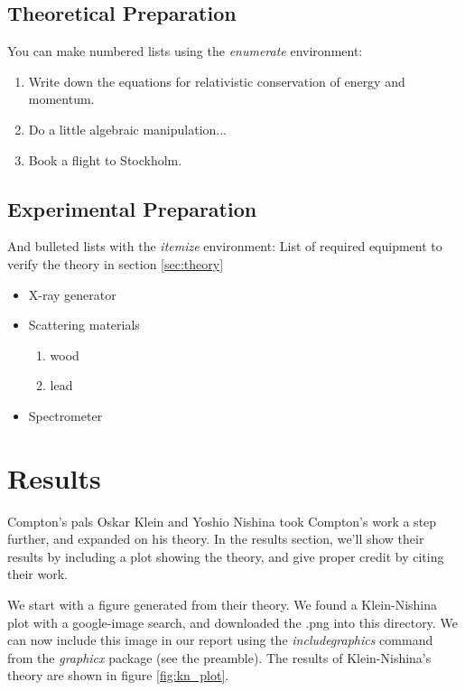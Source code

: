 \documentclass[11pt]{article}
\begin{document}
\subsection{Theoretical Preparation}

You can make numbered lists using the \emph{enumerate} environment:

\begin{enumerate}
  \item Write down the equations for relativistic conservation of energy and
        momentum.
  \item Do a little algebraic manipulation...
  \item Book a flight to Stockholm.
\end{enumerate}

\subsection{Experimental Preparation}

And bulleted lists with the \emph{itemize} environment:
List of required equipment to verify the theory in section \ref{sec:theory}

\begin{itemize}
  \item X-ray generator
  \item Scattering materials
        \begin{enumerate}
          \item wood
          \item lead
        \end{enumerate}
  \item Spectrometer
\end{itemize}

\section{Results}
Compton's pals Oskar Klein and Yoshio Nishina took Compton's work a step
further, and expanded on his theory.
In the results section, we'll show their results by including a plot showing
the theory, and give proper credit by citing their work.

We start with a figure generated from their theory.
We found a Klein-Nishina plot with a google-image search, and downloaded the
.png into this directory.
We can now include this image in our report using the \emph{includegraphics}
command from the \emph{graphicx} package (see the preamble).
The results of Klein-Nishina's theory are shown in figure \ref{fig:kn_plot}.
\end{document}
